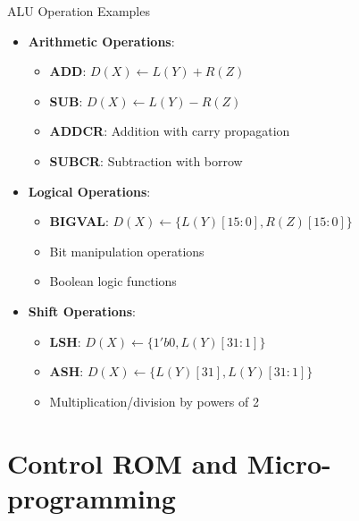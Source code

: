 \documentclass[aspectratio=169,11pt]{beamer}
\newcommand{\concept}[1]{\textbf{\color{accentcolor}#1}}
\begin{document}
\begin{frame}{ALU Operation Examples}
\begin{itemize}
\item \concept{Arithmetic Operations}:
\begin{itemize}
\item \textbf{ADD}: $D(X) \leftarrow L(Y) + R(Z)$
\item \textbf{SUB}: $D(X) \leftarrow L(Y) - R(Z)$
\item \textbf{ADDCR}: Addition with carry propagation
\item \textbf{SUBCR}: Subtraction with borrow
\end{itemize}
\vspace{0.5cm}
\item \concept{Logical Operations}:
\begin{itemize}
\item \textbf{BIGVAL}: $D(X) \leftarrow \{L(Y)[15:0], R(Z)[15:0]\}$
\item Bit manipulation operations
\item Boolean logic functions
\end{itemize}
\vspace{0.3cm}
\item \concept{Shift Operations}:
\begin{itemize}
\item \textbf{LSH}: $D(X) \leftarrow \{1'b0, L(Y)[31:1]\}$
\item \textbf{ASH}: $D(X) \leftarrow \{L(Y)[31], L(Y)[31:1]\}$
\item Multiplication/division by powers of 2
\end{itemize}
\end{itemize}
\end{frame}

\section{Control ROM and Micro-programming}
\end{document}
